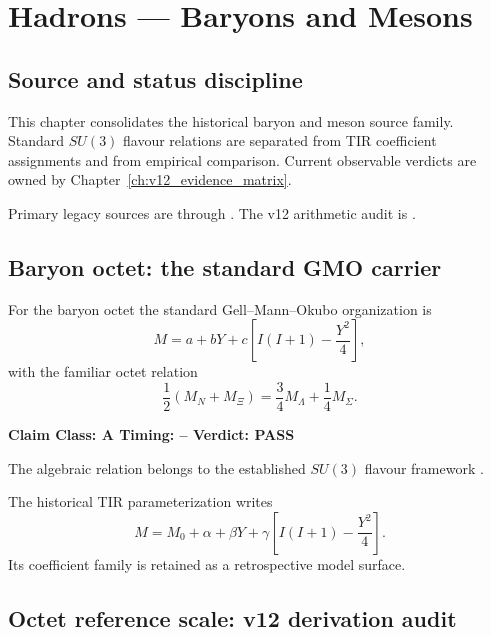 \documentclass[11pt,a4paper,twoside]{book}
\theoremstyle{definition}
\newcommand{\vTwelveStatus}[3]{\par\noindent\textbf{Claim Class: #1 \quad Timing: #2 \quad Verdict: #3}\par}
\begin{document}
\clearpage

\chapter{Hadrons — Baryons and Mesons}
\label{ch:v12_hadrons}

\section{Source and status discipline}

This chapter consolidates the historical baryon and meson source family. Standard $SU(3)$ flavour relations are separated from TIR coefficient assignments and from empirical comparison. Current observable verdicts are owned by Chapter~\ref{ch:v12_evidence_matrix}.

Primary legacy sources are
 through . The v12 arithmetic audit is
.

\section{Baryon octet: the standard GMO carrier}

For the baryon octet the standard Gell--Mann--Okubo organization is
\begin{equation}
M = a+bY+c\left[I(I+1)-\frac{Y^2}{4}\right],
\label{eq:v12_gmo_standard}
\end{equation}
with the familiar octet relation
\begin{equation}
\boxed{
\frac12(M_N+M_\Xi)=\frac34M_\Lambda+\frac14M_\Sigma.
}
\label{eq:v12_gmo_relation}
\end{equation}
\vTwelveStatus{A}{--}{PASS}
The algebraic relation belongs to the established $SU(3)$ flavour framework \cite{GellMann1962,okubo1962}.

The historical TIR parameterization writes
\begin{equation}
M=M_0+\alpha+\beta Y+\gamma\left[I(I+1)-\frac{Y^2}{4}\right].
\label{eq:v12_tir_gmo}
\end{equation}
Its coefficient family is retained as a retrospective model surface.

\section{Octet reference scale: v12 derivation audit}
\end{document}
